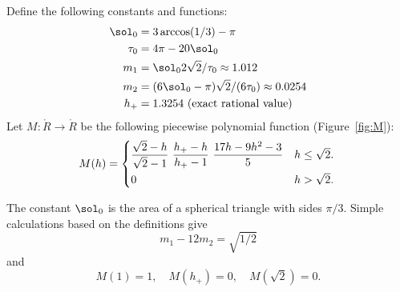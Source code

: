 \begin{definition} 
%
%
%
%
%
%
Define the following constants and functions: 
\begin{align}\label{eqn:m-def} 
\sol_0 &= 3\arccos(1/3)-\pi\\
\tau_0 &= 4\pi  - 20\sol_0\\
m_1 &= \sol_0 2\sqrt2/\tau_0 \approx 1.012 \\ %
m_2  &=  (6\sol_0- \pi)\sqrt2/(6 \tau_0) \approx 0.0254\\ %
h_+ &= 1.3254 \hbox{~(exact rational value)}
\end{align}
Let $M:\ring{R}\to\ring{R}$ 
be the following piecewise polynomial function (Figure~\ref{fig:M}):
\begin{equation}\label{eqn:M} 
M(h) =
\begin{cases} 
\dfrac{\sqrt2-h}{\sqrt2-1}~%
\dfrac{h_+-h}{h_+-1} ~\dfrac{17 h - 9 h^2 - 3}{5} 
& h \le \sqrt2.\vspace{3pt} \\
0 & h >\sqrt2.
\end{cases}
\\
\end{equation}
\end{definition}

\figTULIGLY %


The constant $\sol_0$
is the area of a spherical triangle with sides $\pi/3$.
Simple calculations based on the definitions give
\begin{equation}\label{eqn:km}
m_1 - 12m_2 = \sqrt{1/2}
\end{equation} 
and
\begin{equation}
M(1) = 1,\quad M(h_+)=0,\quad M(\sqrt2) =0.
\end{equation} 


